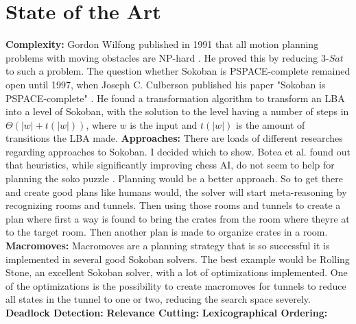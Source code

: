 \documentclass{article}
\begin{document}
\section{State of the Art}
\textbf{Complexity:} Gordon Wilfong published in 1991 that all motion planning problems with moving obstacles are NP-hard \cite{WilfongNPhard}. He proved this by reducing $3$-$Sat$ to such a problem. The question whether Sokoban is PSPACE-complete remained open until 1997, when Joseph C. Culberson published his paper "Sokoban is PSPACE-complete" \cite{PSpaceComplete}. He found a transformation algorithm to transform an LBA into a level of Sokoban, with the solution to the level having a number of steps in $\Theta (|w|+t(|w|))$, where $w$ is the input and $t(|w|)$ is the amount of transitions the LBA made. %
\newline%
\textbf{Approaches:} There are loads of different researches regarding approaches to Sokoban. I decided which to show. Botea et al. found out that heuristics, while significantly improving chess AI, do not seem to help for planning the soko puzzle \cite{BoteaHeuristicsVsPlanning}. Planning would be a better approach. So to get there and create good plans like humans would, the solver will start meta-reasoning by recognizing rooms and tunnels. Then using those rooms and tunnels to create a plan where first a way is found to bring the crates from the room where theyre at to the target room. Then another plan is made to organize crates in a room.
\newline
\textbf{Macromoves:} Macromoves are a planning strategy that is so successful it is implemented in several good Sokoban solvers. The best example would be Rolling Stone, an excellent Sokoban solver, with a lot of optimizations implemented. One of the optimizations is the possibility to create macromoves for tunnels to reduce all states in the tunnel to one or two, reducing the search space severely.
\newline
\textbf{Deadlock Detection:} 
\textbf{Relevance Cutting:}
\newline
\textbf{Lexicographical Ordering:}
\newline
\end{document}
